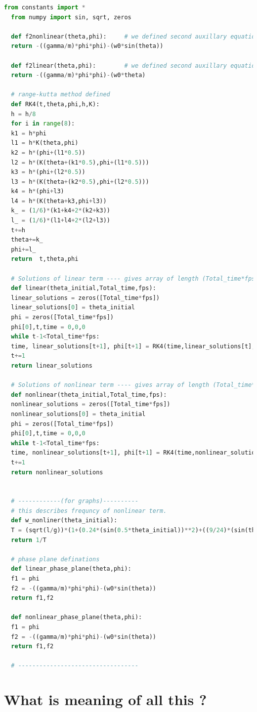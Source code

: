 \documentclass[11pt,a4paper]{article}
\begin{document}
\begin{lstlisting}[language=Python]
  from constants import *
  from numpy import sin, sqrt, zeros

  def f2nonlinear(theta,phi):     # we defined second auxillary equation from nonlinear term.
  return -((gamma/m)*phi*phi)-(w0*sin(theta))

  def f2linear(theta,phi):        # we defined second auxillary equation from linear term.
  return -((gamma/m)*phi*phi)-(w0*theta)

  # range-kutta method defined
  def RK4(t,theta,phi,h,K): 
  h = h/8
  for i in range(8):
  k1 = h*phi
  l1 = h*K(theta,phi)
  k2 = h*(phi+(l1*0.5))
  l2 = h*(K(theta+(k1*0.5),phi+(l1*0.5)))
  k3 = h*(phi+(l2*0.5))
  l3 = h*(K(theta+(k2*0.5),phi+(l2*0.5)))
  k4 = h*(phi+l3)
  l4 = h*(K(theta+k3,phi+l3))
  k_ = (1/6)*(k1+k4+2*(k2+k3))
  l_ = (1/6)*(l1+l4+2*(l2+l3))
  t+=h
  theta+=k_
  phi+=l_
  return  t,theta,phi

  # Solutions of linear term ---- gives array of length (Total_time*fps)
  def linear(theta_initial,Total_time,fps):
  linear_solutions = zeros([Total_time*fps])
  linear_solutions[0] = theta_initial
  phi = zeros([Total_time*fps])
  phi[0],t,time = 0,0,0
  while t-1<Total_time*fps:
  time, linear_solutions[t+1], phi[t+1] = RK4(time,linear_solutions[t],phi[t],1/fps,f2linear)
  t+=1
  return linear_solutions

  # Solutions of nonlinear term ---- gives array of length (Total_time*fps)
  def nonlinear(theta_initial,Total_time,fps):
  nonlinear_solutions = zeros([Total_time*fps])
  nonlinear_solutions[0] = theta_initial
  phi = zeros([Total_time*fps])
  phi[0],t,time = 0,0,0
  while t-1<Total_time*fps:
  time, nonlinear_solutions[t+1], phi[t+1] = RK4(time,nonlinear_solutions[t],phi[t],1/fps,f2nonlinear)
  t+=1
  return nonlinear_solutions


  # ------------(for graphs)----------
  # this describes frequncy of nonlinear term.
  def w_nonliner(theta_initial):
  T = (sqrt(l/g))*(1+(0.24*(sin(0.5*theta_initial))**2)+((9/24)*(sin(theta_initial*0.5))**4))
  return 1/T

  # phase plane definations
  def linear_phase_plane(theta,phi):
  f1 = phi
  f2 = -((gamma/m)*phi*phi)-(w0*sin(theta))
  return f1,f2

  def nonlinear_phase_plane(theta,phi):
  f1 = phi
  f2 = -((gamma/m)*phi*phi)-(w0*sin(theta))
  return f1,f2

  # ----------------------------------

\end{lstlisting}


\section{What is meaning of all this ?}
\label{sec:org94dedd6}
\end{document}
